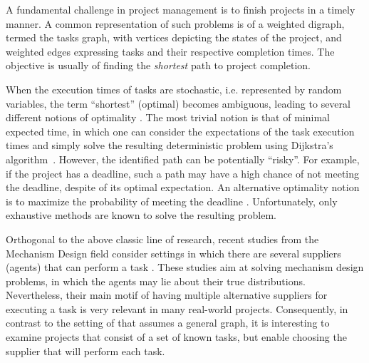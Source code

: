 \documentclass[letterpaper]{article}
\newcommand\Roni[1]{\nb{\textbf{Roni:}}{blue}{#1}}
\begin{document}

A fundamental challenge in project management is to finish projects in a timely manner. A common representation of such problems is of a weighted digraph, termed the tasks graph, with vertices depicting the states of the project, and weighted edges expressing tasks and their respective completion times. The objective is usually of finding the \emph{shortest} path to project completion.

When the execution times of tasks are stochastic, i.e. represented by random variables, the term ``shortest'' (optimal) becomes ambiguous, leading to several different notions of optimality \cite{loui1983optimal}.
The most trivial notion is that of minimal expected time, in which one can consider the expectations of the task execution times and simply solve the resulting deterministic problem using Dijkstra's algorithm~\cite{dijkstra1959note}. However, the identified path can be potentially ``risky''. For example, if the project has a deadline, such a path may have a high chance of not meeting the deadline, despite  of its optimal expectation. An alternative optimality notion is to maximize the probability of meeting the deadline \cite{frank1969shortest}. Unfortunately, only exhaustive methods are known to solve the resulting problem. %

Orthogonal to the above classic line of research, recent studies from the Mechanism Design field consider settings in which there are several suppliers (agents) that can perform a task \cite{porter2008fault,conitzer2014mechanism}. These studies aim at solving mechanism design problems, in which the agents may lie about their true distributions. Nevertheless, their main motif of having multiple alternative suppliers for executing a task is very relevant in many real-world projects. Consequently, in contrast to the setting of \citeauthor{loui1983optimal} that assumes a general graph, it is interesting to examine projects that consist of a set of known tasks, but enable choosing the supplier that will perform each task.
\end{document}

